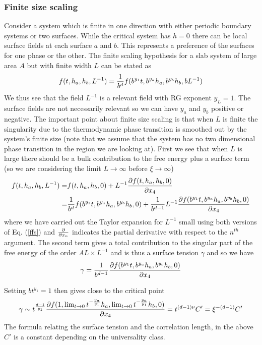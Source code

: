     \subsubsection{Finite size scaling}
Consider a system which is finite in one direction with either periodic boundary systems or 
two surfaces. While the critical system has $h=0$ there can be local surface fields at each surface $a$ and $b$. This represents a preference of the surfaces for one phase or the other. 
The finite scaling hypothesis for a slab  system of large area $A$ but with finite width $L$ can be stated as
\begin{equation}
    f(t,h_a,h_b,L^{-1}) = {1\over b^{d}}f(b^{y_1}t, b^{y_a} h_a, b^{y_b} h_b, bL^{-1}) \label{ffs}
\end{equation}
We thus see that the field $L^{-1}$ is a relevant field with RG exponent $y_L=1$. 
The surface fields are not necessarily relevant so we can have $y_a$ and $y_b$ positive or negative. The important point about finite size scaling is that when $L$ is finite the singularity due to the thermodynamic phase transition is smoothed out by the system's finite size (note that we assume that the system has no two dimensional phase transition in the region we are looking at). First we see that when $L$ is large there should be a bulk contribution to the free energy plus a surface term (so we are considering the limit $L\to\infty$ before $\xi\to\infty$)
\begin{align}
    f(t,h_a,h_b,L^{-1}) =& f(t,h_a,h_b,0) + L^{-1}{\partial f(t,h_a,h_b,0)\over \partial x_4} \nonumber \\
    =& {1\over  b^d} f(b^{y_1}t, b^{y_a} h_a, b^{y_b} h_b,0)+{1\over  b^{d-1}}L^{-1}{\partial f(b^{y_1}t, b^{y_a} h_a, b^{y_b} h_b, 0)\over \partial x_4}
\end{align}
where we have carried out the Taylor expansion for $L^{-1}$ small using both versions of Eq. (\ref{ffs}) and ${\partial \over \partial x_n}$ indicates the partial derivative with respect to the $n^{th}$ argument. 
The second term gives a total contribution to the singular part of the free energy of the order $AL \times L^{-1}$ and is thus a surface tension $\gamma$  and so we have
\begin{equation}
    \gamma= {1\over  b^{d-1}}{\partial f(b^{y_1}t, b^{y_a} h_a, b^{y_b} h_b, 0)\over \partial x_4}
\end{equation}


Setting $bt^{y_1}=1$ then gives close to the critical point
\begin{equation}
    \gamma \sim t^{d-1\over y_1}{\partial f(1,\lim_{t\to 0}  t^{-\frac{y_a}{y_1}}h_a, \lim_{t\to 0}  t^{-\frac{y_a}{y_1}}h_b,0)\over \partial x_4} = t^{(d-1)\nu}C' = \xi^{-(d-1)}C'
\end{equation}
The formula relating the surface tension and the correlation length, in the above $C'$ is a constant depending on the universality class. 

